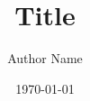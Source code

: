 \documentclass[12pt,a4paper]{article}
\begin{document}
 
\title{Title} 
\author{Author Name}

\date{\today} 
\maketitle 





\end{document}
